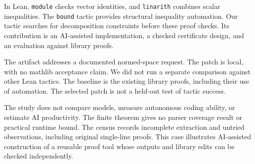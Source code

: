 \documentclass{article}
\begin{document}
In Lean, \texttt{module} checks vector identities, and \texttt{linarith} combines scalar inequalities.
The \texttt{bound} tactic provides structural inequality automation.
Our tactic searches for decomposition constraints before these proof checks.
Its contribution is an AI-assisted implementation, a checked certificate design, and an evaluation against library proofs.

The artifact addresses a documented normed-space request.
The patch is local, with no mathlib acceptance claim.
We did not run a separate comparison against other Lean tactics.
The baseline is the existing library proofs, including their use of automation.
The selected patch is not a held-out test of tactic success.

The study does not compare models, measure autonomous coding ability, or estimate AI productivity.
The finite theorem gives no parser coverage result or practical runtime bound.
The census records incomplete extraction and untried observations, including original single-line proofs.
This case illustrates AI-assisted construction of a reusable proof tool whose outputs and library edits can be checked independently.
\label{main-end}

\clearpage


\clearpage
\appendix

\begingroup
{}

\endgroup
\end{document}
